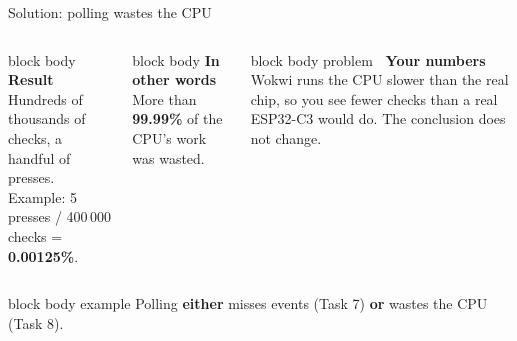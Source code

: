 \documentclass[aspectratio=169,10pt]{beamer}
\newcommand{\stepbox}[2]{%
  \begin{beamercolorbox}[rounded=true,sep=0.09cm,wd=\linewidth]{block body}
    \footnotesize\textbf{#1}\\ #2
  \end{beamercolorbox}\vspace{0.06cm}}
\newcommand{\keymsg}[1]{%
  \begin{beamercolorbox}[rounded=true,sep=0.1cm,wd=\textwidth]{block body example}
    \centering\footnotesize #1
  \end{beamercolorbox}}
\newcommand{\probbox}[2]{%
  \begin{beamercolorbox}[rounded=true,sep=0.09cm,wd=\linewidth]{block body problem}
    \footnotesize\textbf{\textcolor{AccentOrange}{\faExclamationTriangle}\ #1}\\ #2
  \end{beamercolorbox}\vspace{0.06cm}}
\begin{document}
\begin{frame}{Solution: polling wastes the CPU}
  \begin{columns}[c,onlytextwidth]
      \stepbox{Result}{Hundreds of thousands of checks, a handful of presses.\\[0.05cm]
        Example: 5 presses / 400\,000 checks = \textbf{0.00125\%}.}
      \stepbox{In other words}{More than \textbf{99.99\%} of the CPU's work was wasted.}
      \probbox{Your numbers}{Wokwi runs the CPU slower than the real chip, so you see fewer checks than a real ESP32-C3 would do.
        The conclusion does not change.}
  \end{columns}
  \vfill
  \keymsg{Polling \textbf{either} misses events (Task 7) \textbf{or} wastes the CPU (Task 8).}
\end{frame}
\end{document}
